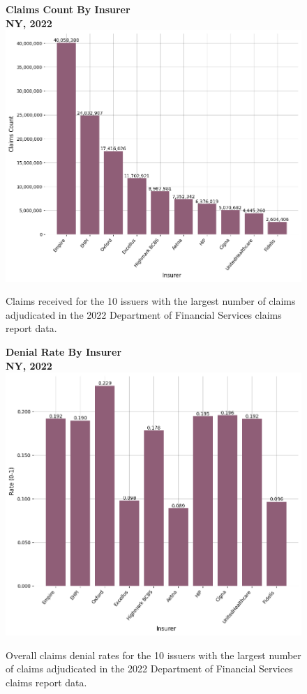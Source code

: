 \documentclass[12pt, a4paper,twoside,parskip=full]{report}
\theoremstyle{plain} %
\theoremstyle{definition} %
\theoremstyle{remark} %
\numberwithin{equation}{chapter}
\begin{document}
		\begin{figure}[h!]
			\centering
			\textbf{Claims Count By Insurer}\\
			\textbf{NY, 2022}\\
			\includegraphics[width=\columnwidth]{images/ny_claim_reports/claims_by_insurer.png}
			\caption{Claims received for the 10 issuers with the largest number of claims adjudicated in the 2022 Department of Financial Services claims report data.}
			\label{nyinsurerclaims}
		\end{figure}
		
		\clearpage
		
		
		\begin{figure}[h!]
			\centering
			\textbf{Denial Rate By Insurer}\\
			\textbf{NY, 2022}\\
			\includegraphics[width=\columnwidth]{images/ny_claim_reports/denial_rate_by_insurer.png}
			\caption{Overall claims denial rates for the 10 issuers with the largest number of claims adjudicated in the 2022 Department of Financial Services claims report data.}
			\label{nyinsurerdenialrates}
		\end{figure}
		
\end{document}

